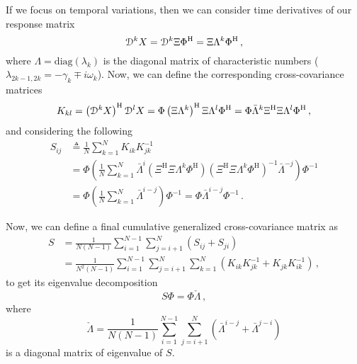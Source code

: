 \documentclass[10pt]{article}
\begin{document}
If we focus on temporal variations, then we can consider time derivatives of our response matrix
\begin{equation}
    {\cal D}^k X = {\cal D}^k \Xi \Phi^\mathrm{H} = \Xi \Lambda^k \Phi^\mathrm{H}\,,
\end{equation}
where $\Lambda=\mathrm{diag}\left( \lambda_k \right)$ is the diagonal matrix of characteristic numbers ($\lambda_{2k-1,2k}=-\gamma_k\mp i\omega_k$).
Now, we can define the corresponding cross-covariance matrices
\begin{equation}
    K_{kl} = \left({\cal D}^k X\right)^\mathrm{H} {\cal D}^l X = \Phi \left(\Xi \Lambda^k\right)^\mathrm{H} \Xi \Lambda^l\Phi^\mathrm{H}=\Phi \bar \Lambda^k \Xi^\mathrm{H}\Xi\Lambda^l\Phi^\mathrm{H}\,,
\end{equation}
and considering the following
\begin{equation}
\begin{aligned}
    S_{ij} &\triangleq \frac{1}{N}\sum_{k=1}^N K_{ik}K_{jk}^{-1}\\ 
    &= \Phi \left(\frac{1}{N}\sum_{k=1}^N \bar \Lambda^i \left( \Xi^\mathrm{H}\Xi\Lambda^k\Phi^\mathrm{H}\right)
    \left( \Xi^\mathrm{H}\Xi\Lambda^k\Phi^\mathrm{H}\right)^{-1}\bar \Lambda^{-j}\right) \Phi^{-1}\\
    &
    = \Phi \left(\frac{1}{N}\sum_{k=1}^N  \bar \Lambda^{i-j} \right) \Phi^{-1} = \Phi \bar \Lambda^{i-j} \Phi^{-1}\,.
\end{aligned}
\end{equation}

Now, we can define a final cumulative generalized cross-covariance matrix as
\begin{equation}
\begin{aligned}
    S &= \frac{1}{N(N-1)}\sum_{i=1}^{N-1} \sum_{j=i+1}^N \left(S_{ij} + S_{ji}\right)\\
    &= \frac{1}{N^2(N-1)}\sum_{i=1}^{N-1} \sum_{j=i+1}^N \sum_{k=1}^N \left(K_{ik} K_{jk}^{-1} + K_{jk} K_{ik}^{-1}\right)\,,
\end{aligned}
\end{equation}
to get its eigenvalue decomposition
\begin{equation}
    S \Phi = \Phi \check \Lambda \,,
\end{equation}
where
\begin{equation}
        \check  \Lambda = \frac{1}{N(N-1)}\sum_{i=1}^{N-1} \sum_{j=i+1}^N \left(\bar \Lambda^{i-j} + \bar \Lambda^{j-i} \right)
\end{equation}
is a diagonal matrix of eigenvalue of $S$.
\end{document}
